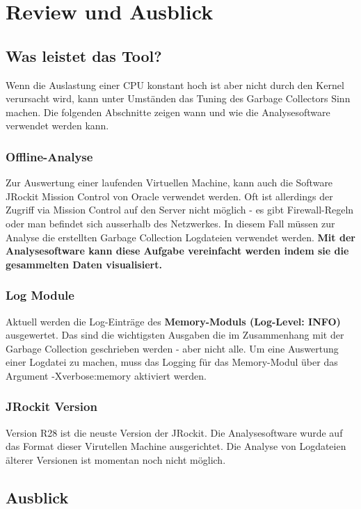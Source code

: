 \chapter{Review und Ausblick}\label{review}
\section{Was leistet das Tool?}
Wenn die Auslastung einer CPU konstant hoch ist aber nicht durch den Kernel verursacht wird, kann unter Umständen das Tuning des Garbage Collectors Sinn machen. Die folgenden Abschnitte zeigen wann und wie die Analysesoftware verwendet werden kann.

\subsection{Offline-Analyse}
Zur Auswertung einer laufenden Virtuellen Machine, kann auch die Software JRockit Mission Control von Oracle verwendet werden. Oft ist allerdings der Zugriff via Mission Control auf den Server nicht möglich - es gibt Firewall-Regeln oder man befindet sich ausserhalb des Netzwerkes. In diesem Fall müssen zur Analyse die erstellten Garbage Collection Logdateien verwendet werden. \textbf{Mit der Analysesoftware kann diese Aufgabe vereinfacht werden indem sie die gesammelten Daten visualisiert.}

\subsection{Log Module}
Aktuell werden die Log-Einträge des \textbf{Memory-Moduls  (Log-Level: INFO)} ausgewertet. Das sind die wichtigsten Ausgaben die im Zusammenhang mit der Garbage Collection geschrieben werden - aber nicht alle. Um eine Auswertung einer Logdatei zu machen, muss das Logging für das Memory-Modul über das Argument -Xverbose:memory aktiviert werden.

\subsection{JRockit Version}
Version R28 ist die neuste Version der JRockit. Die Analysesoftware wurde auf das Format dieser Virutellen Machine ausgerichtet. Die Analyse von Logdateien älterer Versionen ist momentan noch nicht möglich.

\section{Ausblick}
